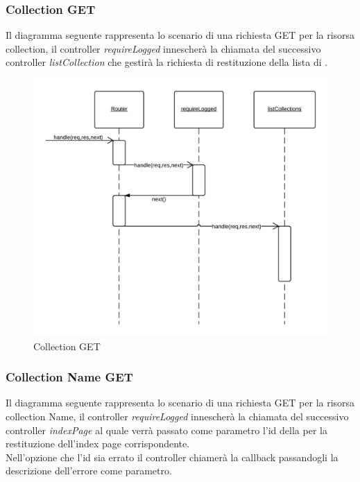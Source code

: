 \subsubsection{Collection GET} 
Il diagramma seguente rappresenta lo scenario di una richiesta GET per la risorsa collection, il controller \emph{requireLogged} innescherà la chiamata del successivo controller \emph{listCollection} che gestirà la richiesta di restituzione della lista di .
\begin{figure}[H]
	\begin{center} 
		\includegraphics[scale=0.20]{scenari/Collection GET.png} 
		\caption{Collection GET}
	\end{center} 
\end{figure}

\subsubsection{Collection Name GET} 
Il diagramma seguente rappresenta lo scenario di una richiesta GET per la risorsa collection Name, il controller \emph{requireLogged} innescherà la chiamata del successivo controller \emph{indexPage} al quale verrà passato come parametro l'id della  per la restituzione dell'index page corrispondente. \\ 
Nell'opzione che l'id sia errato il controller chiamerà la callback passandogli la descrizione dell'errore come parametro.

